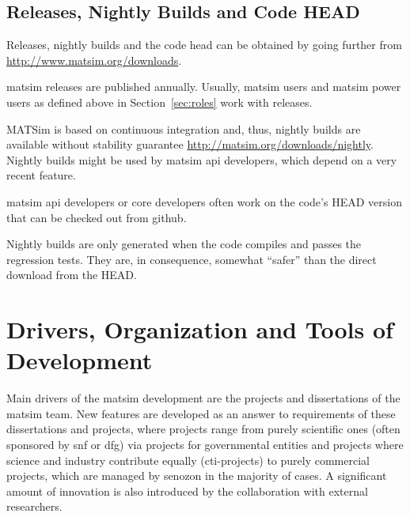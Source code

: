 \subsection{Releases, Nightly Builds and Code HEAD}
\label{sec:releases-builds}

Releases, nightly builds and the code head can be obtained by going further from \url{http://www.matsim.org/downloads}.

\gls{matsim} releases are published annually.
Usually, \gls{matsim} users and \gls{matsim} power users as defined above in Section~\ref{sec:roles} work with releases. 

MATSim is based on continuous integration and, thus, nightly builds are available without stability guarantee \url{http://matsim.org/downloads/nightly}. Nightly builds might be used by \gls{matsim} \gls{api} developers, which depend on a very recent feature. 

\gls{matsim} \gls{api} developers or core developers often work on the code's HEAD version that can be checked out from \gls{github}.

Nightly builds are only generated when the code compiles and passes the regression tests.  They are, in consequence, somewhat ``safer'' than the direct download from the HEAD.

\section{Drivers, Organization and Tools of Development}
Main drivers of the \gls{matsim} development are the projects and dissertations of the \gls{matsim} team. 
New features are developed as an answer to requirements of these dissertations and projects, where projects range 
%
from purely scientific ones (often sponsored by \gls{snf} or \gls{dfg}) 
%
via projects for governmental entities
%
and projects where science and industry contribute equally (\eg \gls{cti}-projects) 
%
to purely 
commercial projects, which are managed by \gls{senozon} in the majority of cases. 
%
A significant amount of innovation is also introduced by the collaboration with external researchers.

